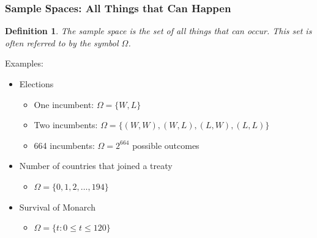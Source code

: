 \documentclass[handout]{beamer}
\newtheorem{defn}{Definition}
\numberwithin{equation}{section}
\begin{document}
\begin{frame}
\frametitle{Sample Spaces: All Things that Can Happen}

\begin{defn}
The \alert{sample space} is the set of all things that can occur.  This set is often referred to by the symbol $\Omega$.
\end{defn}
\pause 
{Examples: } \pause 
\begin{itemize}
\item[1)] \alert{Elections}\pause 
\begin{itemize}
\item[-] One incumbent: $\Omega = \{W, L\}$ \pause 
\item[-] Two incumbents: $\Omega = \{(W,W), (W,L), (L,W),  (L, L)\}$ \pause
\item[-] 664 incumbents: $\Omega = 2^{664}$ possible outcomes  \pause
\end{itemize}
\item[2)] Number of countries that joined a treaty  \pause
\begin{itemize}
\item[-] $\Omega = \{0, 1, 2, \hdots, 194\}$ \pause
\end{itemize}
\item[3)] Survival of Monarch \pause
\begin{itemize}
\item[-] $\Omega = \{t: 0\leq t \leq 120\}$ 
\end{itemize}

\end{itemize}
\end{frame}
\end{document}

